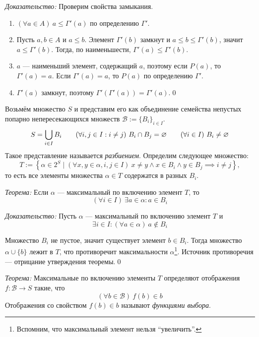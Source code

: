 	{\it Доказательство:}
Проверим свойства замыкания.
\begin{enumerate}
	\item{}$(\forall a\in A)~a\leq \Gamma'(a)$ по определению $\Gamma'$.

	\item{}Пусть $a,b\in A$ и $a\leq b$. Элемент $\Gamma'(b)$ замкнут и
	$a\leq b\leq\Gamma'(b)$, значит $a\leq\Gamma'(b)$. Тогда, по наименьшести,
	$\Gamma'(a)\leq\Gamma'(b)$.

	\item{}$a$ --- наименьший элемент, содержащий $a$, поэтому
	если $P(a)$, то $\Gamma'(a)=a$. Если $\Gamma'(a)=a$, то $P(a)$
	по определению $\Gamma'$.

	\item{}$\Gamma'(a)$ замкнут, поэтому $\Gamma'(\Gamma'(a))=\Gamma'(a)$.\qed
\end{enumerate}

\newcommand\B{\mathcal B}
Возьмём множество $S$ и представим его как объединение семейства непустых
попарно непересекающихся множеств $\B:=\{B_{i}\}_{i\in I}$.
\[
	S=\bigcup_{i\in I}B_{i}\qquad
	(\forall i,j\in I:i\neq j)~B_{i}\cap B_{j}=\varnothing\qquad
	(\forall i\in I)~B_{i}\neq\varnothing
\]
Такое представление называется {\it разбиением}.
Определим следующее множество:
\[
	T:=\left\{\alpha\in 2^{S}\;\big|\; (\forall x,y\in\alpha,i,j\in I)~
	x\neq y\land	x\in B_{i}\land y\in B_{j}\implies i\neq j\right\},
\]
то есть все элементы множества $\alpha\in T$ содержатся в разных $B_{i}$.

\vspace{1em}
{\it Теорема:} Если $\alpha$ --- максимальный по включению элемент $T$, то
\[
	(\forall i\in I)~\exists a\in\alpha:a\in B_{i}
\]

{\it Доказательство:}
Пусть $\alpha$ --- максимальный по включению элемент $T$ и
\[
	\exists i\in I:(\forall a\in\alpha)~a\notin B_{i}
\]

Множество $B_{i}$ не пустое, значит существует элемент $b\in B_{i}$.
Тогда множество $\alpha\cup \{b\}$ лежит в $T$, что противоречит
максимальности $\alpha$\footnote{Вспомним, что максимальный элемент
	нельзя ``увеличить''.}.
Источник противоречия --- отрицание утверждения теоремы.\qed

\vspace{1em}
{\it Теорема:} Максимальные по включению элементы $T$ определяют
отображения $f:\B\to S$ такие, что
\[
	(\forall b\in\B)~f(b)\in b
\]
Отображения со свойством $f(b)\in b$ называют {\it функциями выбора}.

